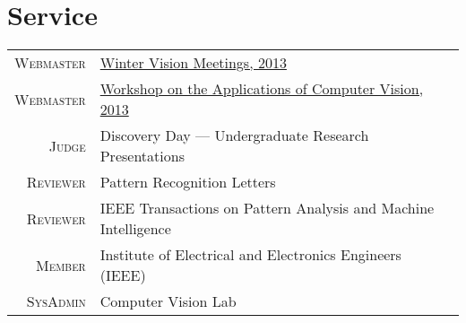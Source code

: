 \documentclass[a4paper,10pt]{article}
\begin{document}
\newcommand{\proj}[3]{
  \textsc{#1} & \footnotesize{#2}\\
  &\href{#3}{#3}\\
  \multicolumn{2}{c}{} \\
}

\section{Service}

\newcommand{\service}[2]{
  \textsc{#1} & #2\\
}

\begin{longtable}{r|p{9cm}}
  \service{Webmaster}{\href{http://cvl.cse.sc.edu/wvm2013/}{Winter Vision Meetings, 2013}}
  \service{Webmaster}{\href{http://cvl.cse.sc.edu/wacv2013/}{Workshop on the Applications of Computer Vision, 2013}}
  \service{Judge}{Discovery Day --- Undergraduate Research Presentations}
  \service{Reviewer}{Pattern Recognition Letters}
  \service{Reviewer}{IEEE Transactions on Pattern Analysis and Machine Intelligence}
  \service{Member}{Institute of Electrical and Electronics Engineers (IEEE)}
  \service{SysAdmin}{Computer Vision Lab}
\end{longtable}
\end{document}
